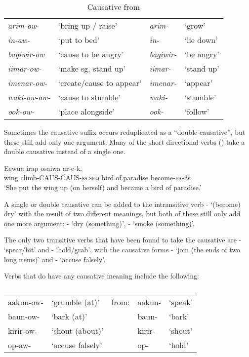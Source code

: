 \begin{table}
\caption{Causative from} 
\begin{tabular}{>{\itshape}ll>{\itshape}ll}
arim-ow- &`bring up / raise' &arim- &`grow'\\
in-aw- &`put to bed' &in- &`lie down'\\
bagiwir-ow &`cause to be angry' &bagiwir- &`be angry'\\
iimar-ow- &`make sg. stand up' &iimar- &`stand up'\\
imenar-ow- &`create/cause to appear' &imenar- &`appear'\\
waki-ow-aw- &`cause to stumble' &waki- &`stumble'\\
ook-ow- &`place alongside' &ook- &`follow'\\
\end{tabular}
\end{table}

Sometimes the causative suffix occurs reduplicated as a ``double causative'', but these still add only one argument. Many of the short directional verbs () take a double causative instead of a single one. 

\ea%
\label{ex:x205}
\gll Eewua irap osaiwa ar-e-k. \\
wing climb-CAUS-CAUS-\textsc{ss}.\textsc{seq} bird.of.paradise become-\textsc{pa}-3s \\
\glt`She put the wing up (on herself) and became a bird of paradise.'
\z

A single or double causative can be added to the intransitive verb - `(become) dry' with the result of two different meanings, but both of these still only add one more argument: - `dry (something)', - `smoke (something)'.

The only two transitive verbs that have been found to take the causative are - `spear/hit' and - `hold/grab', with the causative forms - `join (the ends of two long items)' and - `accuse falsely'. 

Verbs that do  have any causative meaning include the following:

\begin{table}
\caption{}
\label{} 
\begin{tabular}{lllll}
aakun-ow- &`grumble (at)' &from: &aakun- &`speak'\\
baun-ow- &`bark (at)' & &baun- &`bark'\\
kirir-ow- &`shout (about)' & &kirir- &`shout'\\
op-aw- &`accuse falsely' & &op- &`hold'\\
\end{tabular} 

\end{table}

